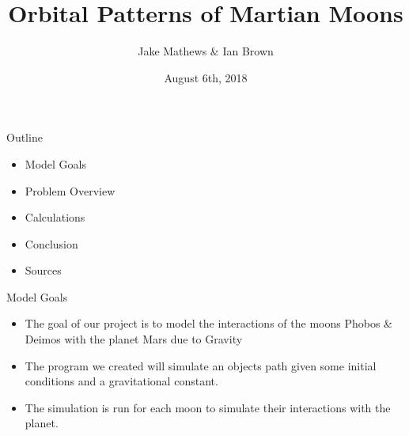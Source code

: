 \documentclass{beamer}  %
\title[Orbital Patterns of Martian Moons]{Orbital Patterns of Martian Moons}
\author{Jake Mathews \& Ian Brown}
\institute{Wentworth Institute of Technology}
\date{August 6th, 2018}
\begin{document}
\begin{frame}
\titlepage
\end{frame}


\begin{frame}{Outline} %

 \begin{itemize}
  \item Model Goals
  \item Problem Overview
  \item Calculations
  \item Conclusion
  \item Sources
 \end{itemize}

\end{frame}


\begin{frame}{Model Goals} %
\begin{itemize}
	\item The goal of our project is to model the interactions of the moons Phobos \& Deimos with the planet Mars due to Gravity
	\item The program we created will simulate an objects path given some initial conditions and a gravitational constant. 
	\item The simulation is run for each moon to simulate their interactions with the planet.
\end{itemize}
\end{frame}
\end{document}
